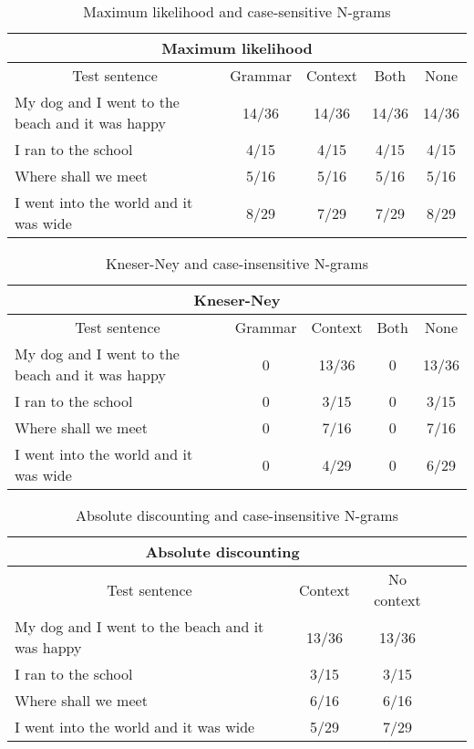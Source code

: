 \vspace{-1cm}
\begin{table}[H]
\centering
\caption{Maximum likelihood and case-sensitive N-grams}
{\scriptsize
\begin{tabular}{ |p{}|c|c|c|c| }
	\hline
	\multicolumn{5}{|c|}{Maximum likelihood} \\
	\hline
	\multicolumn{1}{|c|}{Test sentence} & Grammar & Context & Both & None \\
	\hline
	My dog and I went to the beach and it was happy & 14/36 & 14/36 & 14/36 & 14/36 \\
	\hline
	I ran to the school & 4/15 & 4/15 & 4/15 & 4/15 \\
	\hline
	Where shall we meet & 5/16 & 5/16 & 5/16 & 5/16 \\
	\hline
	I went into the world and it was wide & 8/29 & 7/29 & 7/29 & 8/29 \\
	\hline
\end{tabular}
}
\end{table}
\vspace{-1cm}



\begin{table}[H]
\centering
\caption{Kneser-Ney and case-insensitive N-grams}
{\scriptsize
\begin{tabular}{ |p{}|c|c|c|c| }
	\hline
	\multicolumn{5}{|c|}{Kneser-Ney} \\
	\hline
	\multicolumn{1}{|c|}{Test sentence} & Grammar & Context & Both & None \\
	\hline
	My dog and I went to the beach and it was happy & 0 & 13/36 & 0 & 13/36 \\
	\hline
	I ran to the school & 0 & 3/15 & 0 & 3/15 \\
	\hline
	Where shall we meet & 0 & 7/16 & 0 & 7/16 \\
	\hline
	I went into the world and it was wide & 0 & 4/29 & 0 & 6/29 \\
	\hline
\end{tabular}
}
\end{table}

\vspace{-1cm}
\begin{table}[H]
\centering
\caption{Absolute discounting and case-insensitive N-grams}
{\scriptsize
\begin{tabular}{ |p{}|c|c|c|c| }
	\hline
	\multicolumn{3}{|c|}{Absolute discounting} \\
	\hline
	\multicolumn{1}{|c|}{Test sentence} & Context & No context \\
	\hline
	My dog and I went to the beach and it was happy & 13/36 & 13/36 \\
	\hline
	I ran to the school & 3/15 & 3/15 \\
	\hline
	Where shall we meet & 6/16 & 6/16 \\
	\hline
	I went into the world and it was wide & 5/29 & 7/29 \\
	\hline
\end{tabular}
}
\end{table}

